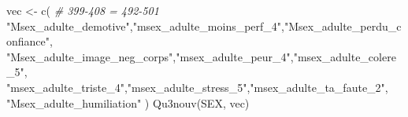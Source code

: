 \documentclass[
]{article}
\newenvironment{Shaded}{\begin{snugshade}}{\end{snugshade}}
\newcommand{\CommentTok}[1]{\textcolor[rgb]{0.56,0.35,0.01}{\textit{#1}}}
\newcommand{\FunctionTok}[1]{\textcolor[rgb]{0.00,0.00,0.00}{#1}}
\newcommand{\NormalTok}[1]{#1}
\newcommand{\OtherTok}[1]{\textcolor[rgb]{0.56,0.35,0.01}{#1}}
\newcommand{\StringTok}[1]{\textcolor[rgb]{0.31,0.60,0.02}{#1}}
\begin{document}
\begin{Shaded}
\begin{Highlighting}[]
\NormalTok{vec }\OtherTok{\textless{}{-}} \FunctionTok{c}\NormalTok{(  }\CommentTok{\# 399{-}408 = 492{-}501}
  \StringTok{"Msex\_adulte\_demotive"}\NormalTok{,}\StringTok{"msex\_adulte\_moins\_perf\_4"}\NormalTok{,}\StringTok{"Msex\_adulte\_perdu\_confiance"}\NormalTok{,}
  \StringTok{"Msex\_adulte\_image\_neg\_corps"}\NormalTok{,}\StringTok{"msex\_adulte\_peur\_4"}\NormalTok{,}\StringTok{"msex\_adulte\_colere\_5"}\NormalTok{,}
  \StringTok{"msex\_adulte\_triste\_4"}\NormalTok{,}\StringTok{"msex\_adulte\_stress\_5"}\NormalTok{,}\StringTok{"msex\_adulte\_ta\_faute\_2"}\NormalTok{,}
  \StringTok{"Msex\_adulte\_humiliation"}
\NormalTok{  )}
\FunctionTok{Qu3nouv}\NormalTok{(SEX, vec)}
\end{Highlighting}
\end{Shaded}
\end{document}
